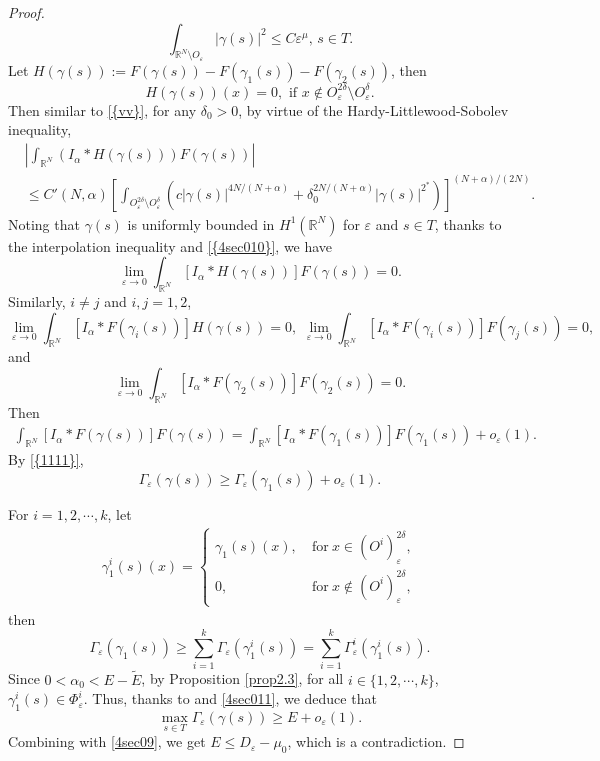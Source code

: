 \documentclass[12pt,reqno]{amsart}
\numberwithin{equation}{section}
\begin{document}
\begin{proof}
\begin{equation}
\int_{{\mathbb R}^N\setminus O_{\varepsilon}}|\gamma(s)|^2\leq
C{\varepsilon}^{\mu},\, s\in T.
\end{equation}
Let $H({\gamma}(s)):=F({\gamma}(s))-F({\gamma}_1(s))-F({\gamma}_2(s))$, then
$$
H({\gamma}(s))(x)=0,\,\, \mbox{if}\,\,x\not\in O_{\varepsilon}^{2{\delta}}\setminus O_{\varepsilon}^{\delta}.
$$
Then similar to {\eqref{{vv}}}, for any ${\delta}_0>0$, by virtue of the  Hardy-Littlewood-Sobolev inequality,
\begin{align*}
&\left|\int_{\mathbb R^N}(I_{\alpha}\ast H({\gamma}(s)))F({\gamma}(s))\right|\nonumber\\
&\le C'(N,{\alpha})\left[\int_{O_{\varepsilon}^{2{\delta}}\setminus O_{\varepsilon}^{\delta}}(c|{\gamma}(s)|^{4N/(N+{\alpha})}+{\delta}_0^{2N/(N+{\alpha})}|{\gamma}(s)|^{2^\ast})\right]^{(N+{\alpha})/(2N)}.
\end{align*}
Noting that ${\gamma}(s)$ is uniformly bounded in $H^1({\mathbb R^N})$ for ${\varepsilon}$ and $s\in T$, thanks to the interpolation inequality and {\eqref{{4sec010}}}, we have
$$
\lim_{{\varepsilon}{\rightarrow}0}\int_{\mathbb R^N}[I_{\alpha}\ast H({\gamma}(s))]F({\gamma}(s))=0.
$$
Similarly, $i\not=j$ and $i,j=1,2$,
$$
\lim_{{\varepsilon}{\rightarrow}0}\int_{\mathbb R^N}[I_{\alpha}\ast F({\gamma}_i(s))]H({\gamma}(s))=0,\,\,\lim_{{\varepsilon}{\rightarrow}0}\int_{\mathbb R^N}[I_{\alpha}\ast F({\gamma}_i(s))]F({\gamma}_j(s))=0,
$$
and
$$
\lim_{{\varepsilon}{\rightarrow}0}\int_{\mathbb R^N}[I_{\alpha}\ast F({\gamma}_2(s))]F({\gamma}_2(s))=0.
$$
Then
\begin{align*}
\int_{\mathbb R^N}[I_{\alpha}\ast F({\gamma}(s))]F({\gamma}(s))=\int_{\mathbb R^N}[I_{\alpha}\ast F({\gamma}_1(s))]F({\gamma}_1(s))+o_{\varepsilon}(1).
\end{align*}
By {\eqref{{1111}}}, \begin{equation}\label{2}
\Gamma_{\varepsilon}(\gamma(s))\geq
\Gamma_{\varepsilon}(\gamma_1(s))+o_{\varepsilon}(1).
\end{equation}

For $i=1,2,\cdots, k$, let
\begin{eqnarray*}
\gamma_1^i(s)(x)=\left\{
                  \begin{array}{ll}
                    \gamma_1(s)(x), \ &\text{for} \ x\in (O^i)_{\varepsilon}^{2\delta}, \\
                    0, \ &\text{for} \ x\notin (O^i)_{\varepsilon}^{2\delta},
                  \end{array}
                \right.
\end{eqnarray*}
then
\begin{equation}\label{4sec011}
\Gamma_{\varepsilon}(\gamma_1(s))\geq
\sum\limits_{i=1}^k\Gamma_{\varepsilon}(\gamma_1^i(s))=\sum\limits_{i=1}^k\Gamma_{\varepsilon}^i(\gamma_1^i(s)).
\end{equation}
Since $0<\alpha_0<E-\tilde{E}$, by Proposition
\ref{prop2.3}, for all $i\in \{1,2,\cdots,k\}$,
$\gamma_1^i(s)\in \Phi_{\varepsilon}^i$. Thus, thanks to
\cite[Proposition 3.4]{CR} and \eqref{4sec011}, we
deduce that
$$\max\limits_{s\in T}\Gamma_{\varepsilon}(\gamma(s))\geq E+o_{\varepsilon}(1).
$$
Combining with \eqref{4sec09}, we get $E\leq D_{\varepsilon}-\mu_0$, which is a contradiction.
\end{proof}
\end{document}
